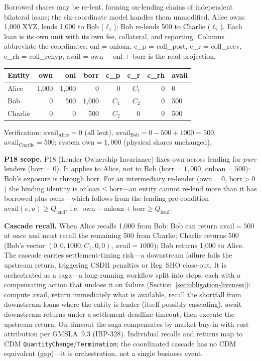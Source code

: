 Borrowed shares may be re-lent, forming on-lending chains of independent bilateral loans; the six-coordinate model handles them unmodified. Alice owns 1{,}000 XYZ, lends 1{,}000 to Bob ($\ell_1$); Bob re-lends 500 to Charlie ($\ell_2$). Each loan is its own unit with its own fee, collateral, and reporting. Columns abbreviate the coordinates: onl = onloan, c\_p = coll\_post, c\_r = coll\_recv, c\_rh = coll\_rehyp; avail = own $-$ onl $+$ borr is the read projection.

\begin{center}\small
\begin{tabular}{l r r r r r r l}
\toprule
\textbf{Entity} & own & onl & borr & c\_p & c\_r & c\_rh & avail \\
\midrule
Alice   & 1{,}000 & 1{,}000 & 0      & 0     & $C_1$ & 0 & 0 \\
Bob     & 0       & 500     & 1{,}000 & $C_1$ & $C_2$ & 0 & 500 \\
Charlie & 0       & 0       & 500     & $C_2$ & 0     & 0 & 500 \\
\bottomrule
\end{tabular}
\end{center}

Verification: $\mathrm{avail}_{\text{Alice}} = 0$ (all lent), $\mathrm{avail}_{\text{Bob}} = 0-500+1000 = 500$, $\mathrm{avail}_{\text{Charlie}} = 500$; system $\mathrm{own} = 1{,}000$ (physical shares unchanged).

\noindent\textbf{P18 scope.} P18 (Lender Ownership Invariance) fixes $\mathrm{own}$ across lending for \emph{pure} lenders ($\mathrm{borr}=0$). It applies to Alice, not to Bob ($\mathrm{borr}=1{,}000$, $\mathrm{onloan}=500$): Bob's exposure is through $\mathrm{borr}$. For an intermediary re-lender ($\mathrm{own}=0$, $\mathrm{borr}>0$) the binding identity is $\mathrm{onloan}\leq\mathrm{borr}$---an entity cannot re-lend more than it has borrowed plus owns---which follows from the lending pre-condition $\mathrm{avail}(e,u)\geq Q_{\mathrm{lend}}$, i.e.\ $\mathrm{own}-\mathrm{onloan}+\mathrm{borr}\geq Q_{\mathrm{lend}}$.

\noindent\textbf{Cascade recall.} When Alice recalls 1{,}000 from Bob: Bob can return $\mathrm{avail}=500$ at once and must recall the remaining 500 from Charlie; Charlie returns 500 (Bob's vector $(0,0,1000,C_1,0,0)$, $\mathrm{avail}=1000$); Bob returns 1{,}000 to Alice. The cascade carries settlement-timing risk---a downstream failure fails the upstream return, triggering CSDR penalties or Reg~SHO close-out. It is orchestrated as a saga---a long-running workflow split into steps, each with a compensating action that undoes it on failure (Section~\ref{sec:obligation-liveness}): compute $\mathrm{avail}$, return immediately what is available, recall the shortfall from downstream loans where the entity is lender (itself possibly cascading), await downstream returns under a settlement-deadline timeout, then execute the upstream return. On timeout the saga compensates by market buy-in with cost attribution per GMSLA~9.3 (IBP-328). Individual recalls and returns map to CDM \texttt{QuantityChange}/\texttt{Termination}; the coordinated cascade has no CDM equivalent (gap)---it is orchestration, not a single business event.

